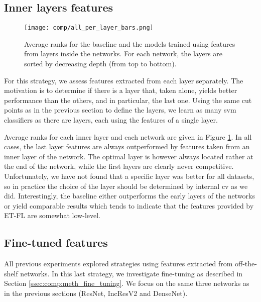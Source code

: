 \subsection{Inner layers features}
\label{ssec:comp:exp_inner_layers}

\begin{figure}
    \center 
    \texttt{[image: comp/all\_per\_layer\_bars.png]}
    \caption{Average ranks for the baseline and the models trained using features from layers inside the networks. For each network, the layers are sorted by decreasing depth (from top to bottom).}
    \label{fig:comp:res_avg_ranks_per_layer}
\end{figure}
 
For this strategy, we assess features extracted from each layer separately. The motivation is to determine if there is a layer that, taken alone, yields better performance than the others, and in particular, the last one. Using the same cut points as in the previous section to define the layers, we learn as many \acrshort{svm} classifiers as there are layers, each using the features of a single layer.

Average ranks for each inner layer and each network are given in Figure \ref{fig:comp:res_avg_ranks_per_layer}. In all cases, the last layer features are always outperformed by features taken from an inner layer of the network. The optimal layer is however always located rather at the end of the network, while the first layers are clearly never competitive. Unfortunately, we have not found that a specific layer was better for all datasets, so in practice the choice of the layer should be determined by internal \acrlong{cv} as we did. Interestingly, the baseline either outperforms the early layers of the networks or yield comparable results which tends to indicate that the features provided by ET-FL are somewhat low-level.

\subsection{Fine-tuned features}
\label{ssec:comp:exp_fine_tuning}

All previous experiments explored strategies using features extracted from off-the-shelf networks. In this last strategy, we investigate fine-tuning as described in Section \ref{ssec:comp:meth_fine_tuning}. We focus on the same three networks as in the previous sections (ResNet, IncResV2 and DenseNet).

